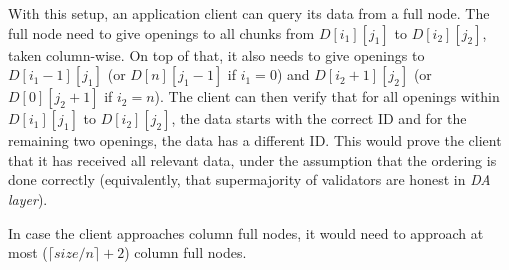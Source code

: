 \documentclass[sigconf, screen=true, nonacm]{acmart}
\newcommand{\DA}{\textit{DA layer}}
\begin{document}
        With this setup, an application client can query its data from a full node. The full node need to give openings to all chunks from $D[i_1][j_1]$ to $D[i_2][j_2]$, taken column-wise. On top of that, it also needs to give openings to $D[i_1-1][j_1]$ (or $D[n][j_1-1]$ if $i_1=0$) and $D[i_2+1][j_2]$ (or $D[0][j_2+1]$ if $i_2=n$). The client can then verify that for all openings within $D[i_1][j_1]$ to $D[i_2][j_2]$, the data starts with the correct ID and for the remaining two openings, the data has a different ID. This would prove the client that it has received all relevant data, under the assumption that the ordering is done correctly (equivalently, that supermajority of validators are honest in \DA). 

        In case the client approaches column full nodes, it would need to approach at most ($\lceil size/n \rceil + 2$) column full nodes. 
    





\end{document}
